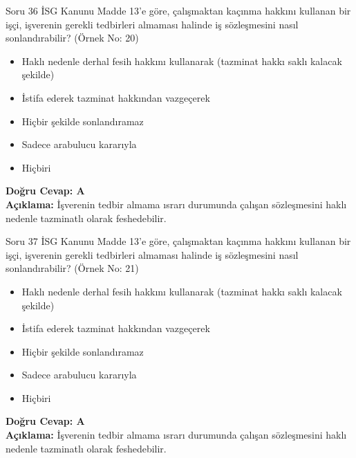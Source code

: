 \documentclass[12pt,a4paper]{article}
\begin{document}
\begin{testcard}{Soru 36}
    İSG Kanunu Madde 13'e göre, çalışmaktan kaçınma hakkını kullanan bir işçi, işverenin gerekli tedbirleri almaması halinde iş sözleşmesini nasıl sonlandırabilir? (Örnek No: 20)
    \begin{itemize}
        \item[A)] Haklı nedenle derhal fesih hakkını kullanarak (tazminat hakkı saklı kalacak şekilde)
        \item[B)] İstifa ederek tazminat hakkından vazgeçerek
        \item[C)] Hiçbir şekilde sonlandıramaz
        \item[D)] Sadece arabulucu kararıyla
        \item[E)] Hiçbiri
    \end{itemize}
    \tcblower
    \textbf{Doğru Cevap: A} \\
    \textbf{Açıklama:} İşverenin tedbir almama ısrarı durumunda çalışan sözleşmesini haklı nedenle tazminatlı olarak feshedebilir.
\end{testcard}

\begin{testcard}{Soru 37}
    İSG Kanunu Madde 13'e göre, çalışmaktan kaçınma hakkını kullanan bir işçi, işverenin gerekli tedbirleri almaması halinde iş sözleşmesini nasıl sonlandırabilir? (Örnek No: 21)
    \begin{itemize}
        \item[A)] Haklı nedenle derhal fesih hakkını kullanarak (tazminat hakkı saklı kalacak şekilde)
        \item[B)] İstifa ederek tazminat hakkından vazgeçerek
        \item[C)] Hiçbir şekilde sonlandıramaz
        \item[D)] Sadece arabulucu kararıyla
        \item[E)] Hiçbiri
    \end{itemize}
    \tcblower
    \textbf{Doğru Cevap: A} \\
    \textbf{Açıklama:} İşverenin tedbir almama ısrarı durumunda çalışan sözleşmesini haklı nedenle tazminatlı olarak feshedebilir.
\end{testcard}
\end{document}
